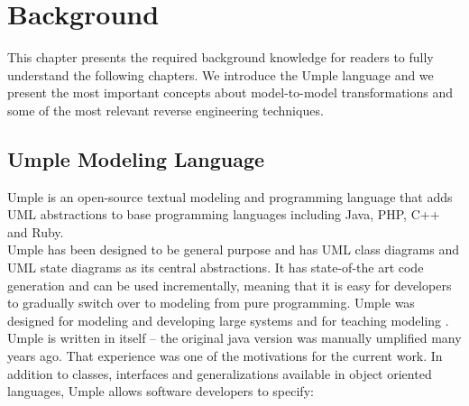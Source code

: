 \lhead{\emph{\leftmark}}  %
\chapter{Background}
\label{chap:background}

This chapter presents the required background knowledge for readers to fully understand the following chapters. We introduce the Umple language and we present the most important concepts about model-to-model transformations and some of the most relevant reverse engineering techniques. 
\section{Umple Modeling Language}

Umple \cite{UmpleMAIN} is an open-source textual modeling and programming language that adds UML abstractions to base programming languages including Java, PHP, C++ and Ruby.\\
Umple has been designed to be general purpose and has UML class diagrams and UML state diagrams as its central abstractions. It has state-of-the art code generation and can be used incrementally, meaning that it is easy for developers to gradually switch over to modeling from pure programming. Umple was designed for modeling and developing large systems and for teaching modeling \cite{teachingUmple}. Umple is written in itself – the original java version was manually umplified many years ago. That experience was one of the motivations for the current work.
In addition to classes, interfaces and generalizations available in object oriented languages, Umple allows software developers to specify:\\
